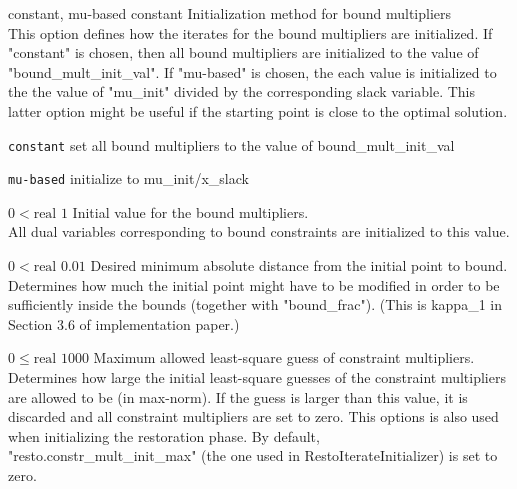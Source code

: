 %
{constant, mu-based}%
{constant}%
{Initialization method for bound multipliers\\
This option defines how the iterates for the bound multipliers are initialized.  If "constant" is chosen, then all bound multipliers are initialized to the value of "bound\_mult\_init\_val".  If "mu-based" is chosen, the each value is initialized to the the value of "mu\_init" divided by the corresponding slack variable.  This latter option might be useful if the starting point is close to the optimal solution.}%
{\begin{list}{}{
\setlength{\parsep}{0em}
\setlength{\leftmargin}{5ex}
\setlength{\labelwidth}{2ex}
\setlength{\itemindent}{0ex}
\setlength{\topsep}{0pt}}
\item[\texttt{constant}] set all bound multipliers to the value of bound\_mult\_init\_val
\item[\texttt{mu-based}] initialize to mu\_init/x\_slack
\end{list}
}

%
{$0<\textrm{real}$}%
{$1$}%
{Initial value for the bound multipliers.\\
All dual variables corresponding to bound constraints are initialized to this value.}%
{}

%
{$0<\textrm{real}$}%
{$0.01$}%
{Desired minimum absolute distance from the initial point to bound.\\
Determines how much the initial point might have to be modified in order to be sufficiently inside the bounds (together with "bound\_frac").  (This is kappa\_1 in Section 3.6 of implementation paper.)}%
{}

%
{$0\leq\textrm{real}$}%
{$1000$}%
{Maximum allowed least-square guess of constraint multipliers.\\
Determines how large the initial least-square guesses of the constraint multipliers are allowed to be (in max-norm). If the guess is larger than this value, it is discarded and all constraint multipliers are set to zero.  This options is also used when initializing the restoration phase. By default, "resto.constr\_mult\_init\_max" (the one used in RestoIterateInitializer) is set to zero.}%
{}

